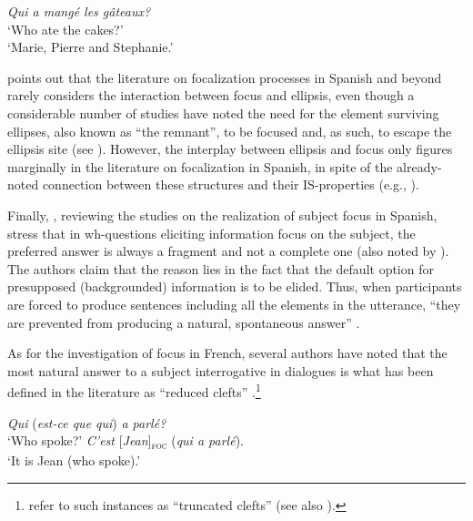 \z \z 

\ea \label{ex:2:18}
\ea \textit{Qui a mangé les gâteaux?}\\
 `Who ate the cakes?'
\normalsize\\
`Marie, Pierre and Stephanie.' \hfill \parencite[398]{lahousse2012word}   
\z \z 


\textcite{ortega2016focus} points out that the literature on focalization processes in Spanish and beyond rarely considers the interaction between focus and ellipsis, even though a considerable number of studies have noted the need for the element surviving ellipses, also known as ``the remnant”,  to be focused and, as such, to escape the ellipsis site (see \cite{merchant1999syntax, merchant1999syntax}). However, the interplay between ellipsis and focus only figures marginally in the literature on focalization in Spanish, in spite of the already-noted connection between these structures and their IS-properties (e.g., \cite{merchant1999syntax}). 

Finally, \textcite{vidal2019nota}, reviewing the studies on the realization of subject focus in Spanish, stress that in wh-questions eliciting information focus on the subject, the preferred answer is always a fragment and not a complete one (also noted by \cite{fery2017intonation}). The authors claim that the reason lies in the fact that the default option for presupposed (backgrounded) information is to be elided. Thus, when participants are forced to produce sentences including all the elements in the utterance, ``they are prevented from producing a natural, spontaneous answer” \parencite[9]{vidal2019nota}.

As for the investigation of focus in French, several authors have noted that the most natural answer to a subject interrogative in dialogues is what has been defined in the literature as “reduced clefts” \parencite{belletti2005answering, belletti2008cp, belletti2008answering}.\footnote{\textcite[538]{doetjes2004cleft} refer to such instances as ``truncated clefts” (see also \cite{buring1998identity, hedberg2000referential}).} 

 \ea \label{ex:2:19}
\ea  \textit{Qui} (\textit{est-ce que qui}) \textit{a parlé?}\\
 `Who spoke?'
\ex \textit{C'est} {[\textit{Jean}]\textsubscript{\textsc{foc}}} \normalsize (\textit{qui a parlé}).\\
`It is Jean (who spoke).' \hfill \parencite[192]{belletti2008cp}    
\z \z


